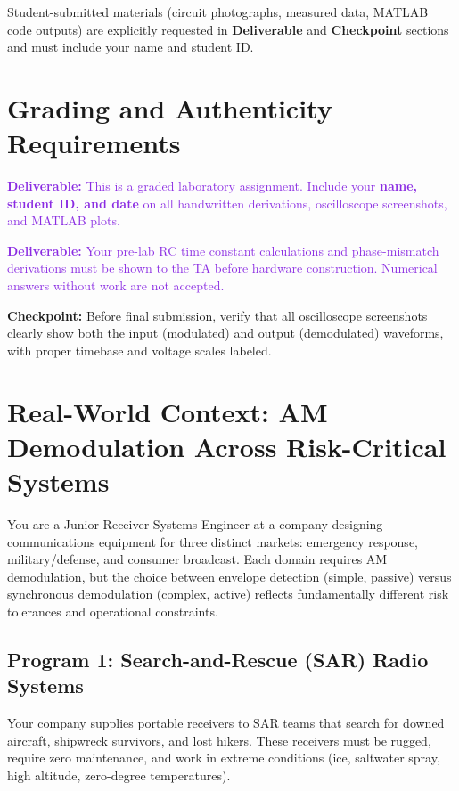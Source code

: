 \documentclass[11pt,letterpaper]{article}
\providecommand{\cpECE}[1]{\textcolor{OliveGreen}{\textbf{Checkpoint:} #1}}
\providecommand{\delECE}[1]{\textcolor{BlueViolet}{\textbf{Deliverable:} #1}}
\begin{document}
\noindent Student-submitted materials (circuit photographs, measured data, MATLAB code outputs) are explicitly requested in \textbf{Deliverable} and \textbf{Checkpoint} sections and must include your name and student ID.

\clearpage

\section*{Grading and Authenticity Requirements}
\delECE{This is a graded laboratory assignment. Include your \textbf{name, student ID, and date} on all handwritten derivations, oscilloscope screenshots, and MATLAB plots.}

\delECE{Your pre-lab RC time constant calculations and phase-mismatch derivations must be shown to the TA before hardware construction. Numerical answers without work are not accepted.}

\cpECE{Before final submission, verify that all oscilloscope screenshots clearly show both the input (modulated) and output (demodulated) waveforms, with proper timebase and voltage scales labeled.}

\clearpage

\section{Real-World Context: AM Demodulation Across Risk-Critical Systems}

\noindent
You are a Junior Receiver Systems Engineer at a company designing communications equipment for three distinct markets: emergency response, military/defense, and consumer broadcast. Each domain requires AM demodulation, but the choice between envelope detection (simple, passive) versus synchronous demodulation (complex, active) reflects fundamentally different risk tolerances and operational constraints.

\subsection{Program 1: Search-and-Rescue (SAR) Radio Systems}

Your company supplies portable receivers to SAR teams that search for downed aircraft, shipwreck survivors, and lost hikers. These receivers must be rugged, require zero maintenance, and work in extreme conditions (ice, saltwater spray, high altitude, zero-degree temperatures).
\end{document}
